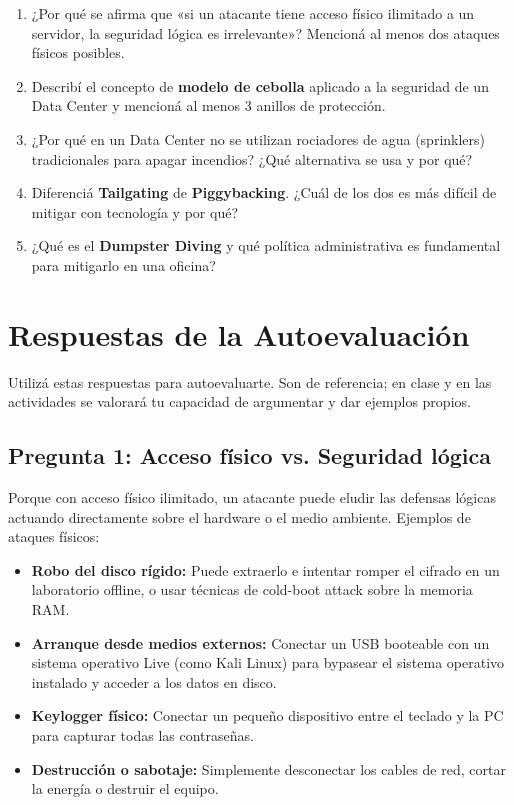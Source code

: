 \documentclass[11pt,a4paper]{article}
\begin{document}
\begin{enumerate}[leftmargin=*]
  \item ¿Por qué se afirma que «si un atacante tiene acceso físico ilimitado a un servidor, la seguridad lógica es irrelevante»? Mencioná al menos dos ataques físicos posibles.
  \item Describí el concepto de \textbf{modelo de cebolla} aplicado a la seguridad de un Data Center y mencioná al menos 3 anillos de protección.
  \item ¿Por qué en un Data Center no se utilizan rociadores de agua (sprinklers) tradicionales para apagar incendios? ¿Qué alternativa se usa y por qué?
  \item Diferenciá \textbf{Tailgating} de \textbf{Piggybacking}. ¿Cuál de los dos es más difícil de mitigar con tecnología y por qué?
  \item ¿Qué es el \textbf{Dumpster Diving} y qué política administrativa es fundamental para mitigarlo en una oficina?
\end{enumerate}

\section{Respuestas de la Autoevaluación}\label{sec:respuestas}

\begin{clave}
Utilizá estas respuestas para autoevaluarte. Son de referencia; en clase y en las actividades se valorará tu capacidad de argumentar y dar ejemplos propios.
\end{clave}

\subsection*{Pregunta 1: Acceso físico vs. Seguridad lógica}
\begin{respuesta}
Porque con acceso físico ilimitado, un atacante puede eludir las defensas lógicas actuando directamente sobre el hardware o el medio ambiente. Ejemplos de ataques físicos:
\begin{itemize}[leftmargin=*]
  \item \textbf{Robo del disco rígido:} Puede extraerlo e intentar romper el cifrado en un laboratorio offline, o usar técnicas de cold-boot attack sobre la memoria RAM.
  \item \textbf{Arranque desde medios externos:} Conectar un USB booteable con un sistema operativo Live (como Kali Linux) para bypasear el sistema operativo instalado y acceder a los datos en disco.
  \item \textbf{Keylogger físico:} Conectar un pequeño dispositivo entre el teclado y la PC para capturar todas las contraseñas.
  \item \textbf{Destrucción o sabotaje:} Simplemente desconectar los cables de red, cortar la energía o destruir el equipo.
\end{itemize}
\end{respuesta}
\end{document}
